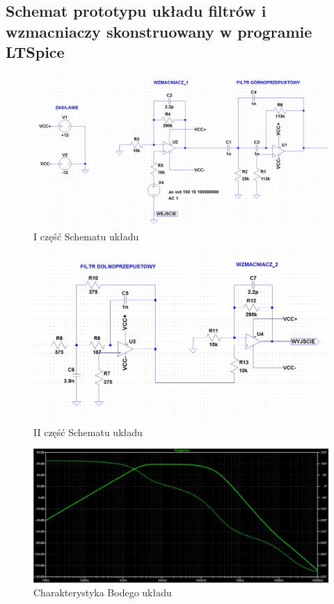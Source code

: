 \documentclass[12pt]{article}
\begin{document}
\subsection{Schemat prototypu układu filtrów i wzmacniaczy skonstruowany w programie LTSpice}
\begin{figure}[H]
\begin{center}
\includegraphics[width=1\textwidth]{figures/schemat1.png}
\caption{I część Schematu układu}
\end{center}
\end{figure}
\begin{figure}[H]
\begin{center}
\includegraphics[width=1\textwidth]{figures/schemat2.png}
\caption{II część Schematu układu}
\end{center}
\end{figure}
\begin{figure}[H]
\begin{center}
\includegraphics[width=1\textwidth]{figures/ampl_faz.png}
\caption{Charakterystyka Bodego układu}
\end{center}
\end{figure}
\end{document}
